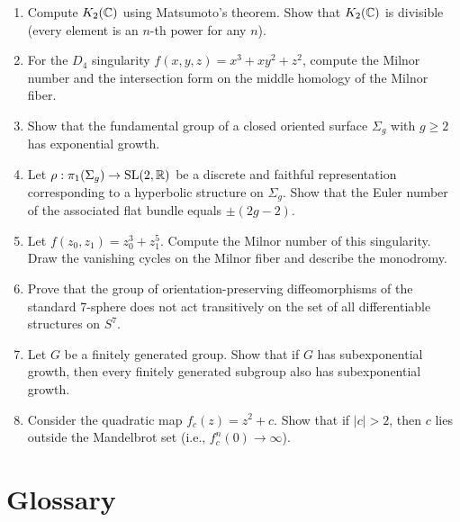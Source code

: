 \begin{enumerate}
    \item [A] Compute \(K_2(\mathbb{C})\) using Matsumoto's theorem. Show that \(K_2(\mathbb{C})\) is divisible (every element is an \(n\)-th power for any \(n\)).
    \item [A] For the \(D_4\) singularity \(f(x,y,z) = x^3 + x y^2 + z^2\), compute the Milnor number and the intersection form on the middle homology of the Milnor fiber.
    \item [B] Show that the fundamental group of a closed oriented surface \(\Sigma_g\) with \(g \geq 2\) has exponential growth.
    \item [A] Let \(\rho: \pi_1(\Sigma_g) \to \operatorname{SL}(2,\mathbb{R})\) be a discrete and faithful representation corresponding to a hyperbolic structure on \(\Sigma_g\). Show that the Euler number of the associated flat bundle equals \(\pm (2g-2)\).
    \item [A] Let \(f(z_0,z_1) = z_0^3 + z_1^5\). Compute the Milnor number of this singularity. Draw the vanishing cycles on the Milnor fiber and describe the monodromy.
    \item [A] Prove that the group of orientation-preserving diffeomorphisms of the standard 7-sphere does not act transitively on the set of all differentiable structures on \(S^7\).
    \item [B] Let \(G\) be a finitely generated group. Show that if \(G\) has subexponential growth, then every finitely generated subgroup also has subexponential growth.
    \item [B] Consider the quadratic map \(f_c(z) = z^2 + c\). Show that if \(|c| > 2\), then \(c\) lies outside the Mandelbrot set (i.e., \(f_c^n(0) \to \infty\)).
\end{enumerate}

\section*{Glossary}

